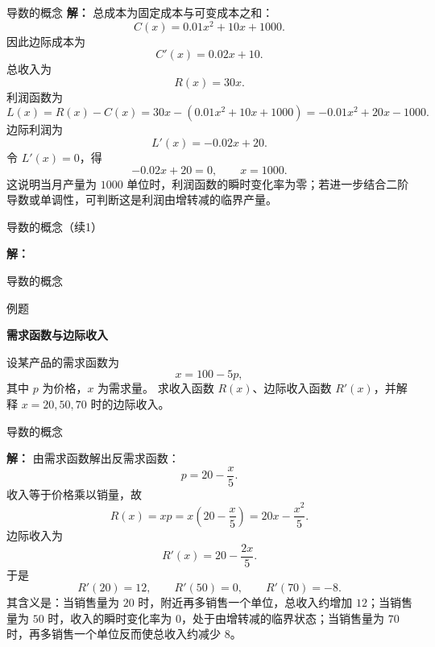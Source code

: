 \documentclass[aspectratio=169,10pt,fontset=fandol]{ctexbeamer}
\begin{document}
\begin{frame}[t,fragile]{导数的概念}
\footnotesize
{\footnotesize
\textbf{解：}
总成本为固定成本与可变成本之和：
\[
C(x)=0.01x^2+10x+1000.
\]
因此边际成本为
\[
C'(x)=0.02x+10.
\]
总收入为
\[
R(x)=30x.
\]
利润函数为
\[
L(x)=R(x)-C(x)=30x-(0.01x^2+10x+1000)
=-0.01x^2+20x-1000.
\]
边际利润为
\[
L'(x)=-0.02x+20.
\]
令 $L'(x)=0$，得
\[
-0.02x+20=0,\qquad x=1000.
\]
这说明当月产量为 $1000$ 单位时，利润函数的瞬时变化率为零；若进一步结合二阶导数或单调性，可判断这是利润由增转减的临界产量。
}
\end{frame}
\begin{frame}[t,fragile]{导数的概念（续1）}
\footnotesize
{\footnotesize
\textbf{解：}


}
\end{frame}
\begin{frame}[t,fragile]{导数的概念}
\footnotesize
\begin{block}{例题}
{\footnotesize
\textbf{需求函数与边际收入}\par

设某产品的需求函数为
\[
x=100-5p,
\]
其中 $p$ 为价格，$x$ 为需求量。 求收入函数 $R(x)$、边际收入函数 $R'(x)$，并解释 $x=20,50,70$ 时的边际收入。

}
\end{block}
\end{frame}
\begin{frame}[t,fragile]{导数的概念}
\footnotesize
{\footnotesize
\textbf{解：}
由需求函数解出反需求函数：
\[
p=20-\frac{x}{5}.
\]
收入等于价格乘以销量，故
\[
R(x)=xp=x\left(20-\frac{x}{5}\right)=20x-\frac{x^2}{5}.
\]
边际收入为
\[
R'(x)=20-\frac{2x}{5}.
\]
于是
\[
R'(20)=12,\qquad R'(50)=0,\qquad R'(70)=-8.
\]
其含义是：当销售量为 $20$ 时，附近再多销售一个单位，总收入约增加 $12$；当销售量为 $50$ 时，收入的瞬时变化率为 $0$，处于由增转减的临界状态；当销售量为 $70$ 时，再多销售一个单位反而使总收入约减少 $8$。

}
\end{frame}
\end{document}
